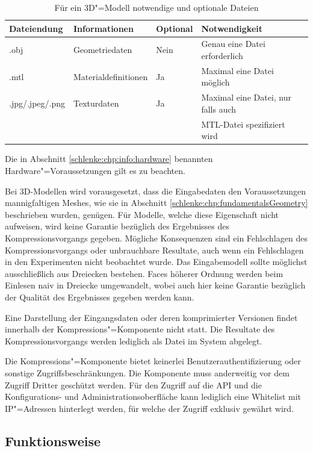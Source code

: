 \begin{table}
\begin{center}
{\footnotesize
\begin{tabular}{llll}
Dateiendung & Informationen & Optional & Notwendigkeit \\
\hline
.obj & Geometriedaten & Nein & Genau eine Datei erforderlich \\
.mtl & Materialdefinitionen & Ja & Maximal eine Datei möglich \\
.jpg/.jpeg/.png & Texturdaten & Ja & Maximal eine Datei, nur falls auch \\
& & & MTL-Datei spezifiziert wird \\
\end{tabular}}
\caption{Für ein 3D"=Modell notwendige und optionale Dateien}
\label{schlenke:tbl:3d-files}
\end{center}
\end{table}

Die in Abschnitt \ref{schlenke:chp:info:hardware} benannten Hardware"=Voraussetzungen gilt es zu beachten.

Bei 3D-Modellen wird vorausgesetzt, dass die Eingabedaten den Voraussetzungen mannigfaltigen Meshes, wie sie in Abschnitt \ref{schlenke:chp:fundamentalsGeometry} beschrieben wurden, genügen. Für Modelle, welche diese Eigenschaft nicht aufweisen, wird keine Garantie bezüglich des Ergebnisses des Kompressionsvorgangs gegeben. Mögliche Konsequenzen sind ein Fehlschlagen des Kompressionsvorgangs oder unbrauchbare Resultate, auch wenn ein Fehlschlagen in den Experimenten nicht beobachtet wurde. Das Eingabemodell sollte möglichst ausschließlich aus Dreiecken bestehen. Faces höherer Ordnung werden beim Einlesen naiv in Dreiecke umgewandelt, wobei auch hier keine Garantie bezüglich der Qualität des Ergebnisses gegeben werden kann. 

Eine Darstellung der Eingangsdaten oder deren komprimierter Versionen findet innerhalb der Kompressions"=Komponente nicht statt. Die Resultate des Kompressionsvorgangs werden lediglich als Datei im System abgelegt.

Die Kompressions"=Komponente bietet keinerlei Benutzerauthentifizierung oder sonstige Zugriffsbeschränkungen. Die Komponente muss anderweitig vor dem Zugriff Dritter geschützt werden. Für den Zugriff auf die API und die Konfigurations- und Administrationsoberfläche kann lediglich eine Whitelist mit IP"=Adressen hinterlegt werden, für welche der Zugriff exklusiv gewährt wird.

\subsection{Funktionsweise}
\label{schlenke:chp:funktionsweise}

